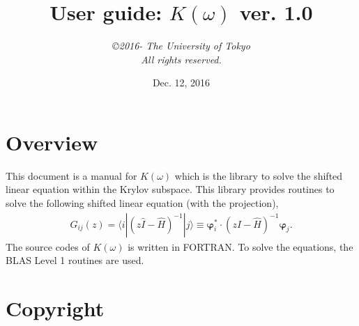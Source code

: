 \documentclass[12pt,titlepage]{article}
\begin{document}
%
%
\title{User guide: $K(\omega)$ ver. 1.0}
\author{{\it \copyright 2016- The University of Tokyo}\\
{\it  All rights reserved.}
}
\date{Dec. 12, 2016}
\maketitle
%

%
%
\tableofcontents

\section{Overview}
This document is a manual for $K(\omega)$ which is the library to solve the shifted linear equation within the Krylov subspace.
This library provides routines to solve the following shifted linear equation (with the projection), 
\begin{align}
  G_{i j}(z) = \langle i | (z {\hat I} -{\hat H})^{-1}| j \rangle \equiv 
  {\boldsymbol \varphi}_i^{*} \cdot (z{\hat I}-{\hat H})^{-1} {\boldsymbol \varphi}_j.
  \label{ShiftedEquatin}
\end{align}
The source codes of $K(\omega)$ is written in FORTRAN.
To solve the equations, the BLAS Level 1 routines are used.
\section{Copyright}
\end{document}
